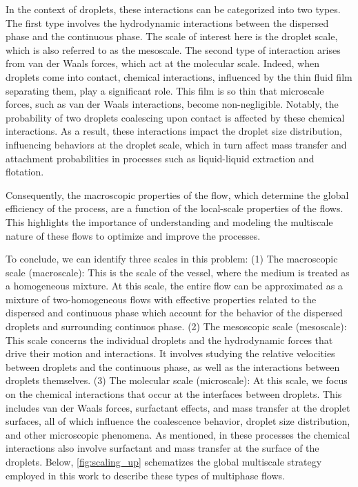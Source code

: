 In the context of droplets, these interactions can be categorized into two types. The first type involves the hydrodynamic interactions between the dispersed phase and the continuous phase. 
The scale of interest here is the droplet scale, which is also referred to as the mesoscale. 
The second type of interaction arises from van der Waals forces, which act at the molecular scale.
Indeed, when droplets come into contact, chemical interactions, influenced by the thin fluid film separating them, play a significant role. This film is so thin that microscale forces, such as van der Waals interactions, become non-negligible. Notably, the probability of two droplets coalescing upon contact is affected by these chemical interactions. As a result, these interactions impact the droplet size distribution, influencing behaviors at the droplet scale, which in turn affect mass transfer and attachment probabilities in processes such as liquid-liquid extraction and flotation.

Consequently, the macroscopic properties of the flow, which determine the global efficiency of the process, are a function of the local-scale properties of the flows.
This highlights the importance of understanding and modeling the multiscale nature of these flows to optimize and improve the processes.

To conclude, we can identify three scales in this problem:
(1) The macroscopic scale (macroscale): This is the scale of the vessel, where the medium is treated as a homogeneous mixture. 
At this scale, the entire flow can be approximated as a mixture of two-homogeneous flows with effective properties related to the dispersed and continuous phase which account for the behavior of the dispersed droplets and surrounding continuos phase.
(2) The mesoscopic scale (mesoscale): This scale concerns the individual droplets and the hydrodynamic forces that drive their motion and interactions. It involves studying the relative velocities between droplets and the continuous phase, as well as the interactions between droplets themselves.
(3) The molecular scale (microscale): At this scale, we focus on the chemical interactions that occur at the interfaces between droplets. This includes van der Waals forces, surfactant effects, and mass transfer at the droplet surfaces, all of which influence the coalescence behavior, droplet size distribution, and other microscopic phenomena. 
As mentioned, in these processes the chemical interactions also involve surfactant and mass transfer at the surface of the droplets.
Below, \ref{fig:scaling_up} schematizes the global multiscale strategy employed in this work to describe these types of multiphase flows.

